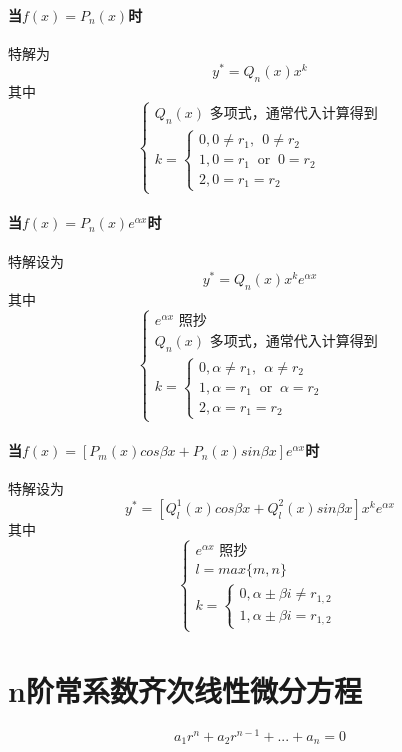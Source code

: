 \paragraph{当\(f(x) = P_n(x)\)时}
特解为\[y^* = Q_n(x)x^k\]其中
\[\begin{cases}
    Q_n(x)\text{ 多项式，通常代入计算得到} \\
    k = \begin{cases}
        0, 0 \neq r_1,\ \ 0 \neq r_2 \\ 
        1, 0 = r_1\ \text{ or }\ 0 = r_2 \\ 
        2, 0 = r_1 = r_2
    \end{cases}
\end{cases}\]

\paragraph{当\(f(x) = P_n(x)e^{\alpha x}\)时}
特解设为
\[y^* = Q_n(x)x^ke^{\alpha x}\]其中
\[\begin{cases}
    e^{\alpha x}\text{ 照抄} \\
    Q_n(x)\text{ 多项式，通常代入计算得到} \\
    k = \begin{cases}
        0, \alpha \neq r_1,\ \ \alpha \neq r_2 \\ 
        1, \alpha = r_1\ \text{ or }\ \alpha = r_2 \\ 
        2, \alpha = r_1 = r_2
    \end{cases}
\end{cases}\]

\paragraph{当\(f(x) = [P_m(x)cos\beta x + P_n(x)sin\beta x]e^{\alpha x}\)时}
特解设为
\[y^* = [Q_l^1(x)cos\beta x + Q_l^2(x)sin\beta x]x^ke^{\alpha x}\]
其中
\[\begin{cases}
    e^{\alpha x}\text{ 照抄} \\ 
    l = max\{m, n\} \\ 
    k = \begin{cases}
        0, \alpha \pm \beta i \neq r_{1,2} \\ 
        1, \alpha \pm \beta i = r_{1,2}
    \end{cases}
\end{cases}\]


\section{n阶常系数齐次线性微分方程}
\[a_1r^n + a_2r^{n - 1} + ... + a_n = 0\]

